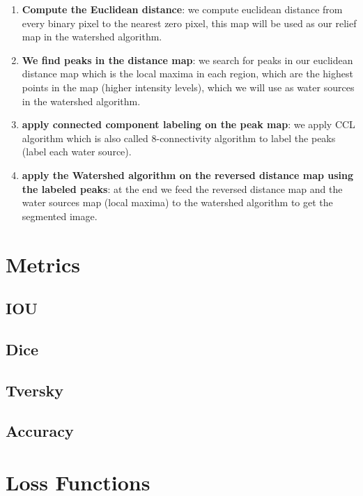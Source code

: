 \begin{enumerate}
    \item \textbf{Compute the Euclidean distance}: we compute euclidean distance from every binary pixel to the nearest zero pixel, this map will be used as our relief map in the watershed algorithm.
    \item \textbf{We find peaks in the distance map}: we search for peaks in our euclidean distance map which is the local maxima in each region, which are the highest points in the map (higher intensity levels), which we will use as water sources in the watershed algorithm.
    \item \textbf{apply connected component labeling on the peak map}: we apply CCL algorithm which is also called 8-connectivity algorithm to label the peaks (label each water source).
    \item \textbf{apply the Watershed algorithm on the reversed distance map using the labeled peaks}: at the end we feed the reversed distance map and the water sources map (local maxima) to the watershed algorithm to get the segmented image. 
\end{enumerate}

\section{Metrics}
\subsection{IOU}

\subsection{Dice}

\subsection{Tversky}

\subsection{Accuracy}


\section{Loss Functions}
